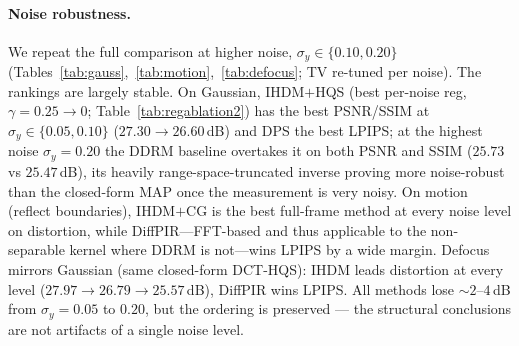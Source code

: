 \documentclass[11pt]{article}
\begin{document}
\paragraph{Noise robustness.}
We repeat the full comparison at higher noise, $\sigma_y\in\{0.10,0.20\}$
(Tables~\ref{tab:gauss},~\ref{tab:motion},~\ref{tab:defocus};
TV re-tuned per noise). The rankings are largely stable. On Gaussian, IHDM$+$HQS (best per-noise
reg, $\gamma{=}0.25\!\to\!0$; Table~\ref{tab:regablation2}) has the best PSNR/SSIM at
$\sigma_y\in\{0.05,0.10\}$ ($27.30\!\to\!26.60$\,dB) and DPS the best
LPIPS; at the highest noise $\sigma_y{=}0.20$ the DDRM baseline overtakes it on both PSNR and SSIM
($25.73$ vs $25.47$\,dB), its heavily range-space-truncated inverse proving more noise-robust than
the closed-form MAP once the measurement is very noisy. On motion
(reflect boundaries), IHDM$+$CG is the best full-frame method at every noise level on distortion,
while DiffPIR---FFT-based and thus applicable to the non-separable kernel where DDRM is not---wins
LPIPS by a wide margin. Defocus mirrors Gaussian (same closed-form DCT-HQS): IHDM
leads distortion at every level ($27.97\!\to\!26.79\!\to\!25.57$\,dB), DiffPIR wins LPIPS. All methods lose
$\sim\!2$--$4$\,dB from $\sigma_y{=}0.05$ to $0.20$, but the ordering is preserved --- the
structural conclusions are not artifacts of a single noise level.



\end{document}
